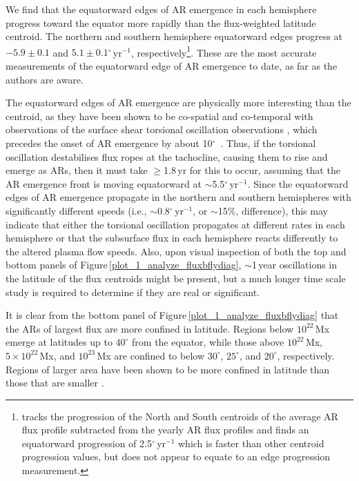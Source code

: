 \documentclass[namedreferences]{solarphysics}
\newcommand{\degr}{\ensuremath{^\circ}}
\begin{document}
\begin{article}
We find that the equatorward edges of AR emergence in each hemisphere progress toward the equator more rapidly than the flux-weighted latitude centroid. The northern and southern hemisphere equatorward edges progress at $-5.9\pm0.1$ and $5.1\pm0.1$\degr\,yr$^{-1}$, respectively\footnote{\citet{jin:2012} tracks the progression of the North and South centroids of the average AR flux profile subtracted from the yearly AR flux profiles and finds an equatorward progression of 2.5\degr\,yr$^{-1}$ which is faster than other centroid progression values, but does not appear to equate to an edge progression measurement.}. These are the most accurate measurements of the equatorward edge of AR emergence to date, as far as the authors are aware.

The equatorward edges of AR emergence are physically more interesting than the centroid, as they have been shown to be co-spatial and co-temporal with observations of the surface shear torsional oscillation observations \citep{Howe:2011}, which precedes the onset of AR emergence by about 10\degr\ \citep{Haber:2002}. Thus, if the torsional oscillation destabilises flux ropes at the tachocline, causing them to rise and emerge as ARs, then it must take $\ge$1.8\,yr for this to occur, assuming that the AR emergence front is moving equatorward at $\sim$5.5\degr\,yr$^{-1}$. Since the equatorward edges of AR emergence propagate in the northern and southern hemispheres with significantly different speeds (i.e., $\sim$0.8\degr\,yr$^{-1}$, or $\sim$15\%, difference), this may indicate that either the torsional oscillation propagates at different rates in each hemisphere or that the subsurface flux in each hemisphere reacts differently to the altered plasma flow speeds.
Also, upon visual inspection of both the top and bottom panels of Figure\,\ref{plot_1_analyze_fluxbflydiag}, $\sim$1\,year oscillations in the latitude of the flux centroids might be present, but a much longer time scale study is required to determine if they are real or significant. 

It is clear from the bottom panel of Figure\,\ref{plot_1_analyze_fluxbflydiag} that the ARs of largest flux are more confined in latitude. Regions below $10^{22}$\,Mx emerge at latitudes up to $40^\circ$ from the equator, while those above  $10^{22}$\,Mx,  $5\times10^{22}$\,Mx, and  $10^{23}$\,Mx are confined to below $30^\circ$, $25^\circ$, and $20^\circ$, respectively. Regions of larger area have been shown to be more confined in latitude than those that are smaller \citep{tang:1984,harvey:1993,meunier:2003}.



\end{article}
\end{document}
